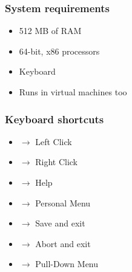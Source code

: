 \documentclass{beamer}
\begin{document}
	\begin{frame}
		\frametitle{System requirements}
		\begin{itemize}
			\item 512 MB of RAM

			\item 64-bit, x86 processors

			\item Keyboard

			\item Runs in virtual machines too
		\end{itemize}
	\end{frame}

	\begin{frame}
		\frametitle{Keyboard shortcuts}
		\begin{itemize}
			\item {} $\rightarrow$ Left Click

			\item {} $\rightarrow$ Right Click

			\item {} $\rightarrow$ Help

			\item {} $\rightarrow$ Personal Menu

			\item {} $\rightarrow$ Save and exit

			\item {} $\rightarrow$ Abort and exit

			\item {} $\rightarrow$ Pull-Down Menu
		\end{itemize}
	\end{frame}
\end{document}
